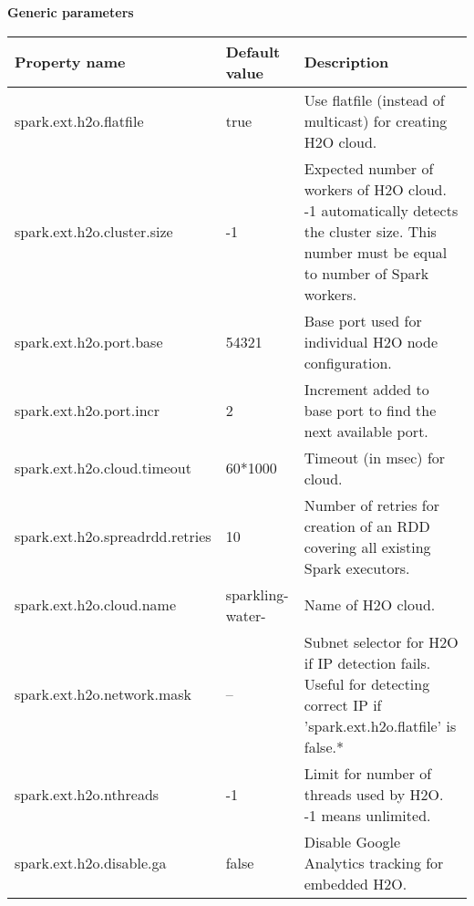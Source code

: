\textbf{Generic parameters}
\begin{table}[!ht]
\centering
{\small
\begin{tabular}{l l p{4.0cm}}
\toprule
Property name & Default value  & Description \\
\midrule
		
spark.ext.h2o.flatfile 	& true & Use flatfile (instead of multicast) for creating H2O cloud. \\  \addlinespace

spark.ext.h2o.cluster.size 	& -1 & Expected number of workers of H2O cloud. -1 automatically
detects the cluster size. This number must be equal to number of Spark workers.\\  \addlinespace

spark.ext.h2o.port.base  & 54321 & Base port used for individual H2O node configuration.\\  \addlinespace

spark.ext.h2o.port.incr  & 2 & Increment added to base port to find the next available port.\\  \addlinespace

spark.ext.h2o.cloud.timeout  & 60*1000 & Timeout (in msec) for cloud.\\  \addlinespace

spark.ext.h2o.spreadrdd.retries & 10 & Number of retries for creation of an RDD covering all existing Spark executors.\\  \addlinespace

spark.ext.h2o.cloud.name & sparkling-water- & Name of H2O cloud.\\  \addlinespace

spark.ext.h2o.network.mask & -- & Subnet selector for H2O if IP detection fails. Useful for detecting correct IP if 'spark.ext.h2o.flatfile' is false.*\\  \addlinespace

spark.ext.h2o.nthreads  & -1 & Limit for number of threads used by H2O. -1 means unlimited.\\  \addlinespace

spark.ext.h2o.disable.ga 	& false &Disable Google Analytics tracking for embedded H2O.\\

\bottomrule
\end{tabular} 
} %
\end{table}

